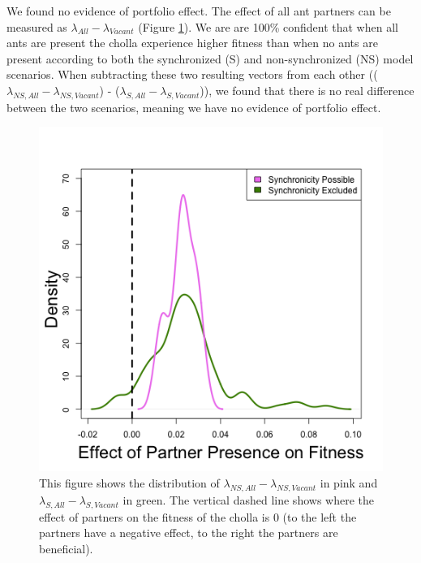 \documentclass[11pt]{article}
\begin{document}
We found no evidence of portfolio effect.
The effect of all ant partners can be measured as $\lambda_{All} - \lambda_{Vacant}$ (Figure \ref{fig:Portfolio}).
We are are 100\% confident that when all ants are present the cholla experience higher fitness than when no ants are present according to both the synchronized (S) and non-synchronized (NS) model scenarios. 
When subtracting these two resulting vectors from each other (($\lambda_{NS,All} - \lambda_{NS,Vacant}$) - ($\lambda_{S,All} - \lambda_{S,Vacant}$)), we found that there is no real difference between the two scenarios, meaning we have no evidence of portfolio effect.

\begin{figure}
	\includegraphics[width=\linewidth]{Figures/portfolio_effect.png}
	\caption{This figure shows the distribution of $\lambda_{NS,All}-\lambda_{NS,Vacant}$ in pink and $\lambda_{S,All}-\lambda_{S,Vacant}$ in green. The vertical dashed line shows where the effect of partners on the fitness of the cholla is 0 (to the left the partners have a negative effect, to the right the partners are beneficial).}
	\label{fig:Portfolio}
\end{figure}
\end{document}
